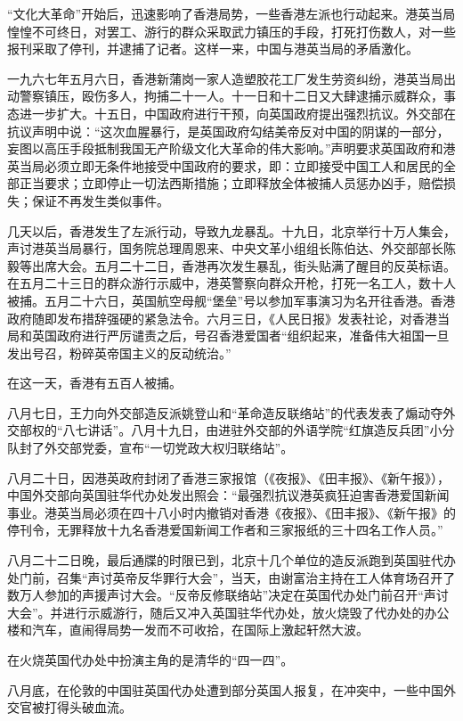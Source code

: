 \begin{maonote}
“文化大革命”开始后，迅速影响了香港局势，一些香港左派也行动起来。港英当局惶惶不可终日，对罢工、游行的群众采取武力镇压的手段，打死打伤数人，对一些报刊采取了停刊，并逮捕了记者。这样一来，中国与港英当局的矛盾激化。

一九六七年五月六日，香港新蒲岗一家人造塑胶花工厂发生劳资纠纷，港英当局出动警察镇压，殴伤多人，拘捕二十一人。十一日和十二日又大肆逮捕示威群众，事态进一步扩大。十五日，中国政府进行干预，向英国政府提出强烈抗议。外交部在抗议声明中说：“这次血腥暴行，是英国政府勾结美帝反对中国的阴谋的一部分，妄图以高压手段抵制我国无产阶级文化大革命的伟大影响。”声明要求英国政府和港英当局必须立即无条件地接受中国政府的要求，即：立即接受中国工人和居民的全部正当要求；立即停止一切法西斯措施；立即释放全体被捕人员惩办凶手，赔偿损失；保证不再发生类似事件。

几天以后，香港发生了左派行动，导致九龙暴乱。十九日，北京举行十万人集会，声讨港英当局暴行，国务院总理周恩来、中央文革小组组长陈伯达、外交部部长陈毅等出席大会。五月二十二日，香港再次发生暴乱，街头贴满了醒目的反英标语。在五月二十三日的群众游行示威中，港英警察向群众开枪，打死一名工人，数十人被捕。五月二十六日，英国航空母舰“堡垒”号以参加军事演习为名开往香港。香港政府随即发布措辞强硬的紧急法令。六月三日，《人民日报》发表社论，对香港当局和英国政府进行严厉谴责之后，号召香港爱国者“组织起来，准备伟大祖国一旦发出号召，粉碎英帝国主义的反动统治。”

在这一天，香港有五百人被捕。

八月七日，王力向外交部造反派姚登山和“革命造反联络站”的代表发表了煽动夺外交部权的“八七讲话”。八月十九日，由进驻外交部的外语学院“红旗造反兵团”小分队封了外交部党委，宣布“一切党政大权归联络站”。

八月二十日，因港英政府封闭了香港三家报馆（《夜报》、《田丰报》、《新午报》），中国外交部向英国驻华代办处发出照会：“最强烈抗议港英疯狂迫害香港爱国新闻事业。港英当局必须在四十八小时内撤销对香港《夜报》、《田丰报》、《新午报》的停刊令，无罪释放十九名香港爱国新闻工作者和三家报纸的三十四名工作人员。”

八月二十二日晚，最后通牒的时限已到，北京十几个单位的造反派跑到英国驻代办处门前，召集“声讨英帝反华罪行大会”，当天，由谢富治主持在工人体育场召开了数万人参加的声援声讨大会。“反帝反修联络站”决定在英国代办处门前召开“声讨大会”。并进行示威游行，随后又冲入英国驻华代办处，放火烧毁了代办处的办公楼和汽车，直闹得局势一发而不可收拾，在国际上激起轩然大波。

在火烧英国代办处中扮演主角的是清华的“四一四”。

八月底，在伦敦的中国驻英国代办处遭到部分英国人报复，在冲突中，一些中国外交官被打得头破血流。


\end{maonote}
